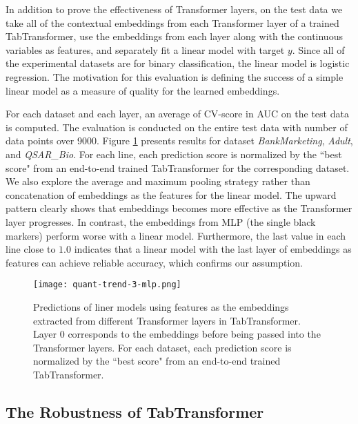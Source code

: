 In addition to prove the effectiveness of Transformer layers, on the test data we take all of the contextual embeddings from each Transformer layer of a trained TabTransformer, use the embeddings from each layer along with the continuous variables as features, and separately fit a linear model with target $y$. Since all of the experimental datasets are for binary classification, the linear model is logistic regression. 
The motivation for this evaluation is defining the success of a simple linear model as a measure of quality for the learned embeddings.

For each dataset and each layer, an average of CV-score in AUC on the test data is computed. The evaluation is conducted on the entire test data with number of data points over 9000. Figure \ref{fig:linear-embedding} presents results for dataset 
\textit{BankMarketing}, \textit{Adult}, and \textit{QSAR\_Bio}. For each line, each prediction score is normalized by the ``best score" from an end-to-end trained TabTransformer for the corresponding dataset. We also explore the average and maximum pooling strategy \citep{howard2018universal} rather than concatenation of embeddings as the features for the linear model. The upward pattern clearly shows that embeddings becomes more effective as the Transformer layer progresses. In contrast, the embeddings from MLP (the single black markers) perform worse with a linear model. Furthermore, the last value in each line close to $1.0$ indicates that a linear model with the last layer of embeddings as features can achieve reliable accuracy, which confirms our assumption. 

\begin{figure}[h]
\centering
\texttt{[image: quant-trend-3-mlp.png]} %
\caption{Predictions of liner models using features as the embeddings extracted from different Transformer layers in TabTransformer. Layer $0$ corresponds to the embeddings before being passed into the Transformer layers. For each dataset, each prediction score is normalized by the ``best score" from an end-to-end trained TabTransformer.}
\label{fig:linear-embedding}
\end{figure}

\subsection{The Robustness of TabTransformer} \label{subsec: The Robustness}


